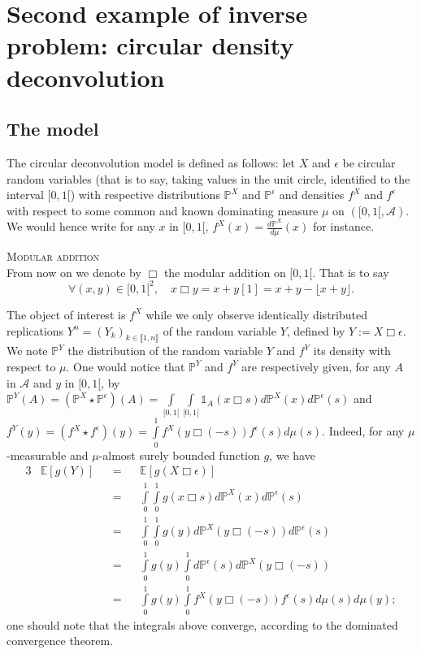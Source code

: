 \section{Second example of inverse problem: circular density deconvolution}\label{INTRO_CIRCULARDECONVOLUTION}

\subsection{The model}
The circular deconvolution model is defined as follows: let $X$ and $\epsilon$ be circular random variables (that is to say, taking values in the unit circle, identified to the interval $[0,1[$) with respective distributions $\mathds{P}^{X}$ and $\mathds{P}^{\epsilon}$ and densities $f^{X}$ and $f^{\epsilon}$ with respect to some common and known dominating measure $\mu$ on $([0, 1[, \mathcal{A})$.
We would hence write for any $x$ in $[0, 1[$, $f^{X}(x) = \frac{d \mathds{P}^{X}}{d \mu} (x)$ for instance.

\begin{de}{\textsc{Modular addition}\\}\label{DE_INTRO_CIRCULARDECONVOLUTION_MODADD}
From now on we denote by $\Box$ the modular addition on $[0,1[$. That is to say
\[\forall (x, y) \in [0,1[^{2}, \quad x\Box y = x+y [1] = x + y - \lfloor x + y \rfloor.\]
\end{de}

The object of interest is $f^{X}$ while we only observe identically distributed replications $Y^{n} = \left(Y_{k}\right)_{k \in \llbracket 1, n \rrbracket}$ of the random variable $Y$, defined by $Y := X \Box \epsilon$.
We note $\mathds{P}^{Y}$ the distribution of the random variable $Y$ and $f^{Y}$ its density with respect to $\mu$.
One would notice that $\mathds{P}^{Y}$ and $f^{Y}$ are respectively given, for any $A$ in $\mathcal{A}$ and $y$ in $[0, 1[$, by $\mathds{P}^{Y}(A) = (\mathds{P}^{X} \star \mathds{P}^{\epsilon})(A) = \int\limits_{[0,1[}\int\limits_{[0,1[} \mathds{1}_{A}(x \Box s)d\mathds{P}^{X}(x)d\mathds{P}^{\epsilon}(s)$ and $f^{Y}(y) = (f^{X} \star f^{\epsilon})(y) = \int\limits_{0}^{1} f^{X}(y \Box (- s))f^{\epsilon}(s)d\mu(s)$.
Indeed, for any $\mu$-measurable and $\mu$-almost surely bounded function $g$, we have
\begin{alignat*}{3}
&\mathds{E}\left[g(Y)\right] &&=&& \mathds{E}\left[g(X \Box \epsilon)\right]\\
& &&=&&\int\limits_{0}^{1}\int\limits_{0}^{1} g(x \Box s) d\mathds{P}^{X}(x)d\mathds{P}^{\epsilon}(s)\\
& &&=&&\int\limits_{0}^{1}\int\limits_{0}^{1} g(y) d\mathds{P}^{X}(y \Box (-s))d\mathds{P}^{\epsilon}(s)\\
& &&=&&\int\limits_{0}^{1} g(y) \int\limits_{0}^{1} d\mathds{P}^{\epsilon}(s) d\mathds{P}^{X}(y \Box (-s))\\
& &&=&&\int\limits_{0}^{1} g(y) \int\limits_{0}^{1}f^{X}(y \Box (- s)) f^{\epsilon}(s)d\mu(s) d\mu(y);
\end{alignat*}
one should note that the integrals above converge, according to the dominated convergence theorem.

